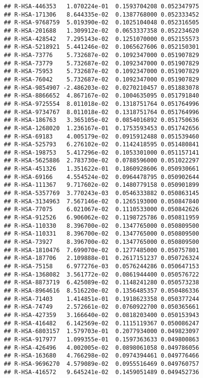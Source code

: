 \documentclass[
]{article}
\begin{document}
\begin{verbatim}
## R-HSA-446353   1.070224e-01  0.1593704208 0.052347975
## R-HSA-171306   8.644335e-02  0.1387768000 0.052333452
## R-HSA-9768759  5.019390e-02  0.1025104048 0.052316505
## R-HSA-201688   1.309912e-02  0.0653337358 0.052234620
## R-HSA-428542   7.295143e-02  0.1251070000 0.052155573
## R-HSA-5218921  5.441246e-02  0.1065627606 0.052150301
## R-HSA-73776    5.732687e-02  0.1092347000 0.051907829
## R-HSA-73779    5.732687e-02  0.1092347000 0.051907829
## R-HSA-75953    5.732687e-02  0.1092347000 0.051907829
## R-HSA-76042    5.732687e-02  0.1092347000 0.051907829
## R-HSA-9854907 -2.486203e-02  0.0270210457 0.051883078
## R-HSA-8866652  4.867167e-02  0.1004635095 0.051791840
## R-HSA-9725554  8.011018e-02  0.1318751764 0.051764996
## R-HSA-9734767  8.011018e-02  0.1318751764 0.051764996
## R-HSA-186763   3.365105e-02  0.0854016892 0.051750636
## R-HSA-1268020  1.236167e-01  0.1753593453 0.051742656
## R-HSA-69183    4.005179e-02  0.0915912488 0.051539460
## R-HSA-525793   6.276102e-02  0.1142418595 0.051480841
## R-HSA-198753   5.417296e-02  0.1053301000 0.051157141
## R-HSA-5625886  2.783730e-02  0.0788596000 0.051022297
## R-HSA-451326   1.351622e-01  0.1860928606 0.050930661
## R-HSA-69166    4.554524e-02  0.0964478795 0.050902644
## R-HSA-111367   9.717602e-02  0.1480779158 0.050901899
## R-HSA-5357769  3.770243e-03  0.0546333882 0.050863145
## R-HSA-3134963  7.567146e-02  0.1265193000 0.050847840
## R-HSA-77075    6.021067e-02  0.1110533000 0.050842626
## R-HSA-912526   6.906062e-02  0.1198725786 0.050811959
## R-HSA-110330   8.396700e-02  0.1347765000 0.050809500
## R-HSA-110331   8.396700e-02  0.1347765000 0.050809500
## R-HSA-73927    8.396700e-02  0.1347765000 0.050809500
## R-HSA-1810476  7.699070e-02  0.1277485000 0.050757801
## R-HSA-187706   2.109888e-01  0.2617151237 0.050726324
## R-HSA-75158    6.977276e-03  0.0576244286 0.050647153
## R-HSA-1368082  3.561772e-02  0.0861944400 0.050576722
## R-HSA-8873719  6.425089e-02  0.1148241280 0.050573238
## R-HSA-8964616  8.516220e-02  0.1356485357 0.050486336
## R-HSA-71403    1.414851e-01  0.1918623358 0.050377244
## R-HSA-74749    2.572661e-02  0.0760922700 0.050365661
## R-HSA-427359   3.166640e-02  0.0818203400 0.050153943
## R-HSA-416482   6.142569e-02  0.1115119367 0.050086247
## R-HSA-6803157  1.579703e-01  0.2077934000 0.049823097
## R-HSA-917977   1.099355e-01  0.1597363633 0.049800863
## R-HSA-426496   4.002005e-02  0.0898061058 0.049786056
## R-HSA-163680   4.766298e-02  0.0974394461 0.049776466
## R-HSA-9696270  4.579089e-02  0.0955516469 0.049760757
## R-HSA-416572   9.645241e-02  0.1459051489 0.049452736

\end{verbatim}
\end{document}
